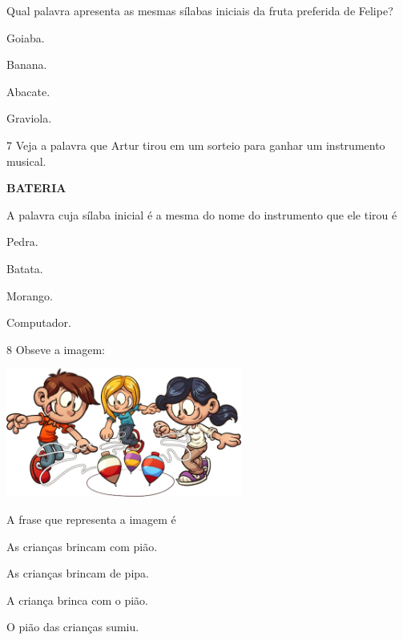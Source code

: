 Qual palavra apresenta as mesmas sílabas iniciais da fruta preferida de Felipe?

\begin{escolha}
\item Goiaba.

\item Banana.

\item Abacate.

\item Graviola.
\end{escolha}

\num{7} Veja a palavra que Artur tirou em um sorteio para ganhar um instrumento musical.

\textbf{BATERIA}

A palavra cuja sílaba inicial é a mesma do nome do instrumento que ele tirou é

\begin{escolha}
\item Pedra.

\item Batata.

\item Morango.

\item Computador.
\end{escolha}

\num{8} Obseve a imagem:

\includegraphics[width=3.05095in,height=1.66841in]{media/image144.jpeg}


A frase que representa a imagem é

\begin{escolha}
\item As crianças brincam com pião.

\item As crianças brincam de pipa.

\item A criança brinca com o pião.

\item O pião das crianças sumiu.
\end{escolha}

